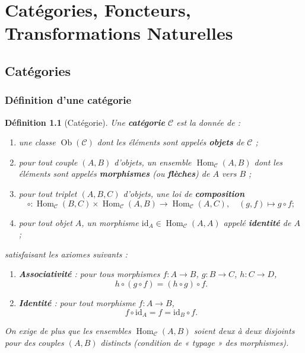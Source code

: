 \documentclass[a4paper,12pt]{book}
\DeclareMathOperator{\Hom}{Hom}
\DeclareMathOperator{\Ob}{Ob}
\newcommand{\id}{\mathrm{id}}
\newtheorem{definition}[theoreme]{Définition}
\begin{document}
\chapter{Catégories, Foncteurs, Transformations Naturelles}
\minitoc

\section{Catégories}

\subsection{Définition d'une catégorie}

\begin{definition}[Catégorie]\label{def:categorie}
Une \textbf{catégorie} $\mathcal{C}$ est la donnée de :
\begin{enumerate}[label=(\roman*)]
  \item une classe $\Ob(\mathcal{C})$ dont les éléments sont appelés \textbf{objets} de $\mathcal{C}$ ;
  \item pour tout couple $(A, B)$ d'objets, un ensemble $\Hom_{\mathcal{C}}(A, B)$ dont les éléments sont appelés \textbf{morphismes} (ou \textbf{flèches}) de $A$ vers $B$ ;
  \item pour tout triplet $(A, B, C)$ d'objets, une loi de \textbf{composition}
  \[
    \circ : \Hom_{\mathcal{C}}(B, C) \times \Hom_{\mathcal{C}}(A, B) \longrightarrow \Hom_{\mathcal{C}}(A, C), \quad (g, f) \longmapsto g \circ f ;
  \]
  \item pour tout objet $A$, un morphisme $\id_A \in \Hom_{\mathcal{C}}(A, A)$ appelé \textbf{identité} de $A$ ;
\end{enumerate}
satisfaisant les axiomes suivants :
\begin{enumerate}[label=(C\arabic*)]
  \item \textbf{Associativité} : pour tous morphismes $f : A \to B$, $g : B \to C$, $h : C \to D$,
  \[ h \circ (g \circ f) = (h \circ g) \circ f. \]
  \item \textbf{Identité} : pour tout morphisme $f : A \to B$,
  \[ f \circ \id_A = f = \id_B \circ f. \]
\end{enumerate}
On exige de plus que les ensembles $\Hom_{\mathcal{C}}(A, B)$ soient deux à deux disjoints pour des couples $(A,B)$ distincts (condition de « typage » des morphismes).
\end{definition}
\end{document}
